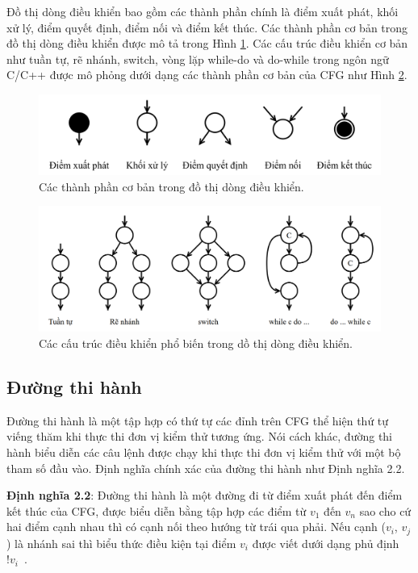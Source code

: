 Đồ thị dòng điều khiển bao gồm các thành phần chính là điểm xuất phát, khối xử lý, điểm quyết định, điểm nối và điểm kết thúc. Các thành phần cơ bản trong đồ thị dòng điều khiển được mô tả trong Hình \ref{fig:flow-element}. Các cấu trúc điều khiển cơ bản như tuần tự, rẽ nhánh, switch, vòng lặp while-do và do-while trong ngôn ngữ C/C++ được mô phỏng dưới dạng các thành phần cơ bản của CFG như Hình \ref{fig:flow-structure}.
\begin{figure}[h]
	\centering
	\includegraphics[width=\linewidth]{images/flow-element.png}
	\caption{Các thành phần cơ bản trong đồ thị dòng điều khiển.}
	\label{fig:flow-element}
\end{figure}

\begin{figure}[h]
	\centering
	\includegraphics[width=\linewidth]{images/flow-structure.png}
	\caption{Các cấu trúc điều khiển phổ biến trong dồ thị dòng điều khiển.}
	\label{fig:flow-structure}
\end{figure}

\subsection{Đường thi hành}\label{sec:path}
Đường thi hành là một tập hợp có thứ tự các đỉnh trên CFG thể hiện thứ tự viếng thăm khi thực thi đơn vị kiểm thử tương ứng. Nói cách khác, đường thi hành biểu diễn các câu lệnh được chạy khi thực thi đơn vị kiểm thử với một bộ tham số đầu vào. Định nghĩa chính xác của đường thi hành như Định nghĩa 2.2.

\textbf{Định nghĩa 2.2}: Đường thi hành là một đường đi từ điểm xuất phát đến điểm kết thúc của CFG, được biểu diễn bằng tập hợp các điểm từ $v_1$ đến $v_n$ sao cho cứ hai điểm cạnh nhau thì có cạnh nối theo hướng từ trái qua phải. Nếu cạnh ($v_i$, $v_j$) là nhánh sai thì biểu thức điều kiện tại điểm $v_i$ được viết dưới dạng phủ định $!v_i$~\cite{GiaoTrinhKiemThu}.

